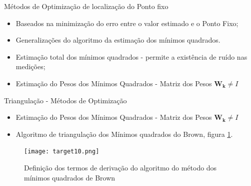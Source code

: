 \documentclass[portuguese,10pt]{beamer}
\begin{document}
 \begin{frame}{Métodos de Optimização de localização do Ponto fixo}
   
    \begin{itemize}
        \item Baseados na minimização do erro entre o valor estimado e o Ponto Fixo;
         \vspace*{5mm}
        \item Generalizações do algoritmo da estimação dos mínimos quadrados. 
        \vspace*{5mm}
         \item Estimação total dos mínimos quadrados - permite a existência de ruído nas medições; 
        \vspace*{5mm}
        \item Estimação do Pesos dos Mínimos Quadrados - Matriz dos Pesos $\mathbf{W_k}\neq I $
         
    \end{itemize}
   
\end{frame}

  \begin{frame}{Triangulação - Métodos de Optimização}
   
    \begin{itemize}
  
        
        \item Estimação do Pesos dos Mínimos Quadrados - Matriz dos Pesos $\mathbf{W_k}\neq I $
       
        \vspace*{3mm}
        
        \item Algoritmo de triangulação dos Mínimos quadrados do Brown, figura \ref{target10}.
        
        
        
    \end{itemize}
    \begin{figure}[ht]
\centering
\texttt{[image: target10.png]}
\caption{Definição dos termos de derivação do algoritmo do método dos mínimos quadrados de Brown}
\label{target10}
\end{figure}
\end{frame}
\end{document}
